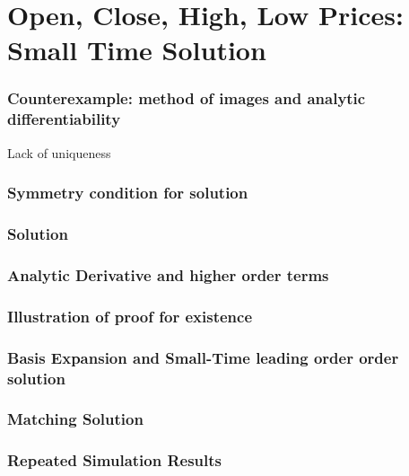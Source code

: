 \documentclass{beamer}
\begin{document}
\section{Open, Close, High, Low Prices: Small Time Solution}
\begin{frame}
  \frametitle{Counterexample: method of images and analytic differentiability}
  Lack of uniqueness
\end{frame}
\begin{frame}
  \frametitle{Symmetry condition for solution}
\end{frame}
\begin{frame}
  \frametitle{Solution}
\end{frame}
\begin{frame}
  \frametitle{Analytic Derivative and higher order terms}
\end{frame}
\begin{frame}
  \frametitle{Illustration of proof for existence}
\end{frame}
\begin{frame}
  \frametitle{Basis Expansion and Small-Time leading order order solution}
\end{frame}
\begin{frame}
  \frametitle{Matching Solution}
\end{frame}
\begin{frame}
  \frametitle{Repeated Simulation Results}
\end{frame}
\end{document}
